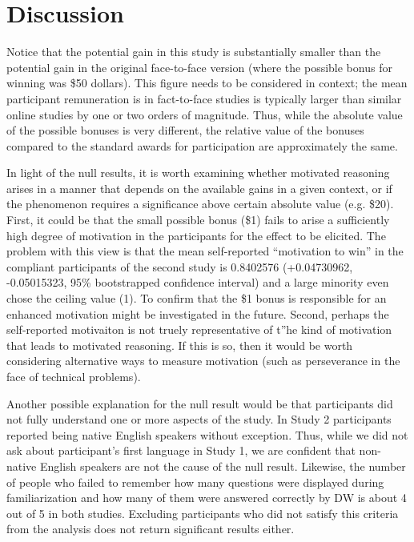 \documentclass{article}
\begin{document}
\section{Discussion}


Notice that the potential gain in this study is substantially smaller than the potential gain in the original face-to-face version (where the possible bonus for winning was \$50 dollars). This figure needs to be considered in context; the mean participant remuneration is in fact-to-face studies is typically larger than similar online studies by one or two orders of magnitude. Thus, while the absolute value of the possible bonuses is very different, the relative value of the bonuses compared to the standard awards for participation are approximately the same. 

In light of the null results, it is worth examining whether motivated reasoning arises in a manner that depends on the available gains in a given context, or if the phenomenon requires a significance above certain absolute value (e.g. \$20). First, it could be that the small possible bonus (\$1) fails to arise a sufficiently high degree of motivation in the participants for the effect to be elicited. The problem with this view is that the mean self-reported ``motivation to win'' in the compliant participants of the second study is 0.8402576 (+0.04730962, -0.05015323, 95\% bootstrapped confidence interval) and a large minority even chose the ceiling value (1). To confirm that the \$1 bonus is responsible for an enhanced motivation might be investigated in the future. Second, perhaps the self-reported motivaiton is not truely representative of t''he kind of motivation that leads to motivated reasoning. If this is so, then it would be worth considering alternative ways to measure motivation (such as perseverance in the face of technical problems).

Another possible explanation for the null result would be that participants did not fully understand one or more aspects of the study. In Study 2 participants reported being native English speakers without exception. Thus, while we did not ask about participant's first language in Study 1, we are confident that non-native English speakers are not the cause of the null result. Likewise, the number of people who failed to remember how many questions were displayed during familiarization and how many of them were answered correctly by DW is about 4 out of 5 in both studies. Excluding participants who did not satisfy this criteria from the analysis does not return significant results either. 
\end{document}

